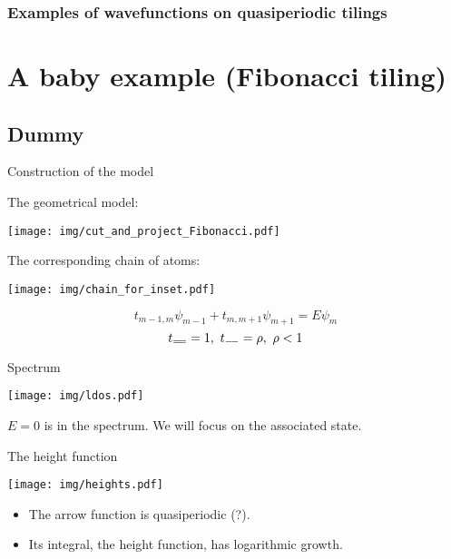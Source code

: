 \documentclass[xcolor=x11names,compress,professionalfonts]{beamer}
\author{Nicolas Macé}
\renewcommand{\(}{\begin{columns}}
\renewcommand{\)}{\end{columns}}
\newcommand{\<}[1]{\begin{column}{#1}}
\renewcommand{\>}{\end{column}}
\begin{document}
\begin{frame}
\frametitle{Examples of wavefunctions on quasiperiodic tilings}
\tableofcontents[hideallsubsections]
\end{frame}

\section{A baby example (Fibonacci tiling)}
\subsection{Dummy}
\begin{frame}{Construction of the model}

		The geometrical model:
		
		{\centering
		\texttt{[image: img/cut\_and\_project\_Fibonacci.pdf]}
		
		}
		
		The corresponding chain of atoms:
		
		{\centering
		\texttt{[image: img/chain\_for\_inset.pdf]}
		
		}
\[
	 t_{m-1,m} \psi_{m-1} + t_{m,m+1}\psi_{m+1} = E \psi_{m}
\]
\[
	t_{=\joinrel=} = 1,~t_{-\joinrel-} = \rho,~\rho<1
\]

\end{frame}

\begin{frame}{Spectrum}

{\centering
\texttt{[image: img/ldos.pdf]}

}

$E=0$ is in the spectrum. We will focus on the associated state.

\end{frame}

\begin{frame}{The height function}

{\centering
\texttt{[image: img/heights.pdf]}

}

\begin{itemize}
	\item The arrow function is quasiperiodic (?).
	\item Its integral, the height function, has logarithmic growth.
\end{itemize}
\end{frame}
\end{document}
